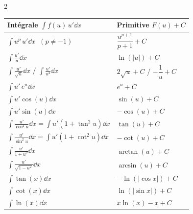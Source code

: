 {\fontsize{9.3pt}{11.3pt}\selectfont
\setlength{\columnsep}{18pt}
\begin{multicols}{2}

\begin{center}
\vspace{-4pt}
{\footnotesize
\renewcommand{\arraystretch}{1.42}
\setlength{\tabcolsep}{1.6pt}
\begin{tabular}{|l|l|}
\hline
\textbf{Intégrale $\displaystyle\int f(u)\,u'\dd x$} & \textbf{Primitive $F(u) + C$} \\ \hline
$\displaystyle\int u^p\,u'\dd x \;\; (p \neq -1)$ & $\dfrac{u^{p+1}}{p+1} + C$ \\ \hline
$\displaystyle\int \frac{u'}{u}\dd x$ & $\ln(|u|) + C$ \\ \hline
$\displaystyle\int \frac{u'}{\sqrt{u}}\dd x$ \; / \; $\displaystyle\int \frac{u'}{u^2}\dd x$ & $2\sqrt{u} + C$ \; / \; $-\dfrac{1}{u} + C$ \\ \hline
$\displaystyle\int u'\,e^u\dd x$ & $e^u + C$ \\ \hline
$\displaystyle\int u'\cos(u)\dd x$ & $\sin(u) + C$ \\ \hline
$\displaystyle\int u'\sin(u)\dd x$ & $-\cos(u) + C$ \\ \hline
$\displaystyle\int \frac{u'}{\cos^2 u}\dd x = \int u'(1+\tan^2 u)\dd x$ & $\tan(u) + C$ \\ \hline
$\displaystyle\int \frac{u'}{\sin^2 u}\dd x = \int u'(1+\cot^2 u)\dd x$ & $-\cot(u) + C$ \\ \hline
$\displaystyle\int \frac{u'}{1 + u^2}\dd x$ & $\arctan(u) + C$ \\ \hline
$\displaystyle\int \frac{u'}{\sqrt{1 - u^2}}\dd x$ & $\arcsin(u) + C$ \\ \hline
$\displaystyle\int \tan(x)\dd x$ & $-\ln(|\cos x|) + C$ \\ \hline
$\displaystyle\int \cot(x)\dd x$ & $\ln(|\sin x|) + C$ \\ \hline
$\displaystyle\int \ln(x)\dd x$ & $x\ln(x) - x + C$ \\ \hline
\end{tabular}
}
\end{center}


\end{multicols}}
